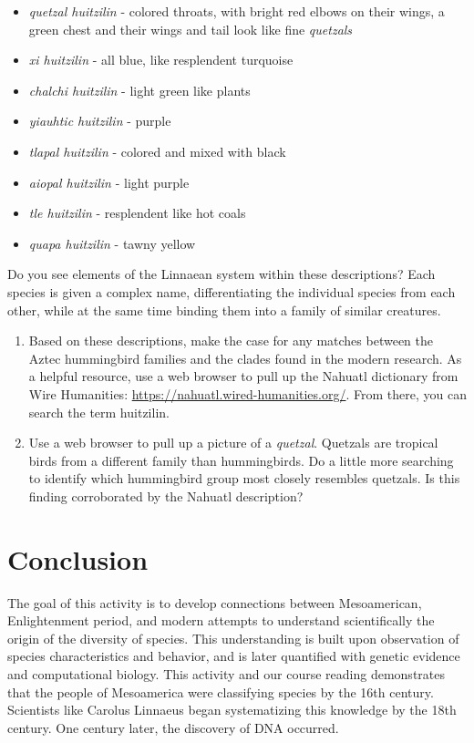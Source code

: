 \documentclass[12pt]{article}
\begin{document}
\begin{itemize}
\item \textit{quetzal huitzilin} - colored throats, with bright red elbows on their wings, a green chest and their wings and tail look like fine \textit{quetzals}
\item \textit{xi huitzilin} - all blue, like resplendent turquoise
\item \textit{chalchi huitzilin} - light green like plants
\item \textit{yiauhtic huitzilin} - purple
\item \textit{tlapal huitzilin} - colored and mixed with black
\item \textit{aiopal huitzilin} - light purple
\item \textit{tle huitzilin} - resplendent like hot coals
\item \textit{quapa huitzilin} - tawny yellow
\end{itemize}

Do you see elements of the Linnaean system within these descriptions?  Each species is given a complex name, differentiating the individual species from each other, while at the same time binding them into a family of similar creatures.

\begin{enumerate}
\item Based on these descriptions, make the case for any matches between the Aztec hummingbird families and the clades found in the modern research. As a helpful resource, use a web browser to pull up the Nahuatl dictionary from Wire Humanities: \url{https://nahuatl.wired-humanities.org/}.  From there, you can search the term huitzilin.  \\ \vspace{2.5cm}
\item Use a web browser to pull up a picture of a \textit{quetzal}.  Quetzals are tropical birds from a different family than hummingbirds.  Do a little more searching to identify which hummingbird group most closely resembles quetzals.  Is this finding corroborated by the Nahuatl description? \\ \vspace{2.5cm}
\end{enumerate}

\section{Conclusion}

The goal of this activity is to develop connections between Mesoamerican, Enlightenment period, and modern attempts to understand scientifically the origin of the diversity of species.  This understanding is built upon observation of species characteristics and behavior, and is later quantified with genetic evidence and computational biology.  This activity and our course reading demonstrates that the people of Mesoamerica were classifying species by the 16th century.  Scientists like Carolus Linnaeus began systematizing this knowledge by the 18th century.  One century later, the discovery of DNA occurred.
\end{document}
